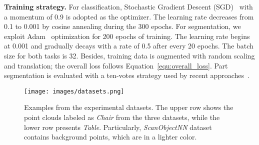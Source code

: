 \documentclass[10pt,twocolumn,letterpaper]{article}
\begin{document}
\noindent \textbf{Training strategy.} For classification, Stochastic Gradient Descent (SGD)~\cite{loshchilov2016sgdr} with a momentum of 0.9 is adopted as the optimizer. The learning rate decreases from 0.1 to 0.001 by cosine annealing \cite{loshchilov2016sgdr} during the 300 epochs. For segmentation, we exploit Adam~\cite{kingma2014adam} optimization for 200 epochs of training. The learning rate begins at 0.001 and gradually decays with a rate of 0.5 after every 20 epochs. The batch size for both tasks is 32. Besides, training data is augmented with random scaling and translation; the overall loss follows Equation~\ref{equ:overall_loss}. Part segmentation is evaluated with a ten-votes strategy used by recent approaches~\cite{qi2017pointnet, qi2017pointnet++, liu2019relation}.

\begin{figure}
\begin{center}
\texttt{[image: images/datasets.png]}
\end{center}
\caption{Examples from the experimental datasets. The upper row shows the point clouds labeled as \emph{Chair} from the three datasets, while the lower row presents \emph{Table}. Particularly, \emph{ScanObjectNN} dataset contains background points, which are in a lighter color.} 
\label{fig:data}
\end{figure}
\end{document}
